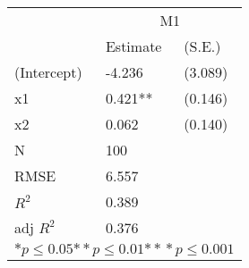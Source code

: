 \begin{tabular}{*{3}{l}}
\hline
                  & \multicolumn{2}{c}{M1}   \tabularnewline
                   &Estimate  &(S.E.)  \tabularnewline
 \hline
 \hline
   (Intercept)     &-4.236   &   (3.089) \tabularnewline
   x1              &0.421**   &   (0.146) \tabularnewline
   x2              &0.062   &   (0.140) \tabularnewline
 \hline
 N                 &100       &        \tabularnewline
 RMSE             &6.557         & \tabularnewline
 $R^2$             &0.389         & \tabularnewline
 adj $R^2$         &0.376         & \tabularnewline
 \hline
\hline
 
 \multicolumn{3}{c}{${*  p}\le 0.05$${*\!\!*  p}\le 0.01$${*\!\!*\!\!*  p}\le 0.001$}\tabularnewline
 \end{tabular}